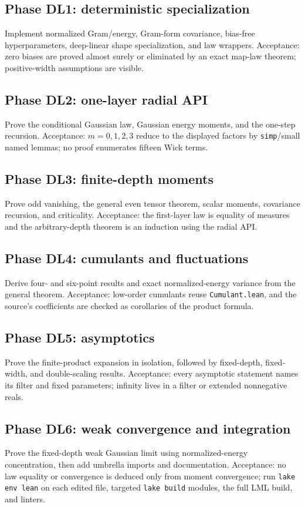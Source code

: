 \subsection*{Phase DL1: deterministic specialization}
Implement normalized Gram/energy, Gram-form covariance, bias-free hyperparameters, deep-linear
shape specialization, and law wrappers.  Acceptance: zero biases are proved almost surely or
eliminated by an exact map-law theorem; positive-width assumptions are visible.

\subsection*{Phase DL2: one-layer radial API}
Prove the conditional Gaussian law, Gaussian energy moments, and the one-step recursion.
Acceptance: $m=0,1,2,3$ reduce to the displayed factors by \texttt{simp}/small named lemmas; no
proof enumerates fifteen Wick terms.

\subsection*{Phase DL3: finite-depth moments}
Prove odd vanishing, the general even tensor theorem, scalar moments, covariance recursion, and
criticality.  Acceptance: the first-layer law is equality of measures and the arbitrary-depth
theorem is an induction using the radial API.

\subsection*{Phase DL4: cumulants and fluctuations}
Derive four- and six-point results and exact normalized-energy variance from the general theorem.
Acceptance: low-order cumulants reuse \texttt{Cumulant.lean}, and the source's coefficients are
checked as corollaries of the product formula.

\subsection*{Phase DL5: asymptotics}
Prove the finite-product expansion in isolation, followed by fixed-depth, fixed-width, and
double-scaling results.  Acceptance: every asymptotic statement names its filter and fixed
parameters; infinity lives in a filter or extended nonnegative reals.

\subsection*{Phase DL6: weak convergence and integration}
Prove the fixed-depth weak Gaussian limit using normalized-energy concentration, then add umbrella
imports and documentation.  Acceptance: no law equality or convergence is deduced only from moment
convergence; run \texttt{lake env lean} on each edited file, targeted \texttt{lake build} modules,
the full LML build, and linters.

